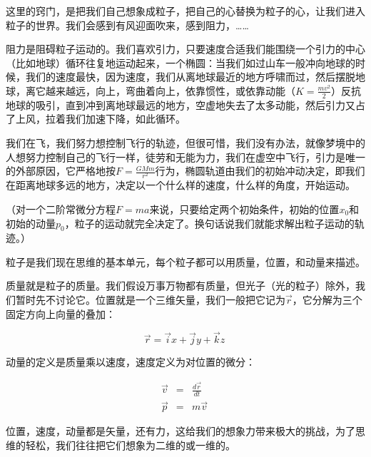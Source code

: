 这里的窍门，是把我们自己想象成粒子，把自己的心替换为粒子的心，让我们进入粒子的世界。我们会感到有风迎面吹来，感到阻力，……

阻力是阻碍粒子运动的。我们喜欢引力，只要速度合适我们能围绕一个引力的中心（比如地球）循环往复地运动起来，一个椭圆：当我们如过山车一般冲向地球的时候，我们的速度最快，因为速度，我们从离地球最近的地方呼啸而过，然后摆脱地球，离它越来越远，向上，弯曲着向上，依靠惯性，或依靠动能（$K = \frac{mv^2}{2}$）反抗地球的吸引，直到冲到离地球最远的地方，空虚地失去了太多动能，然后引力又占了上风，拉着我们加速下降，如此循环。

我们在飞，我们努力想控制飞行的轨迹，但很可惜，我们没有办法，就像梦境中的人想努力控制自己的飞行一样，徒劳和无能为力，我们在虚空中飞行，引力是唯一的外部原因，它严格地按$F = \frac{G M m}{r^2}$行为，椭圆轨道由我们的初始冲动决定，即我们在距离地球多远的地方，决定以一个什么样的速度，什么样的角度，开始运动。

（对一个二阶常微分方程$F = m a$来说，只要给定两个初始条件，初始的位置$x_0$和初始的动量$p_0$，粒子的运动就完全决定了。换句话说我们就能求解出粒子运动的轨迹。）

粒子是我们现在思维的基本单元，每个粒子都可以用质量，位置，和动量来描述。

质量就是粒子的质量。我们假设万事万物都有质量，但光子（光的粒子）除外，我们暂时先不讨论它。位置就是一个三维矢量，我们一般把它记为$\vec r$，它分解为三个固定方向上向量的叠加：

\begin{equation}
\vec r = \vec i x + \vec j y + \vec k z~
\end{equation}

动量的定义是质量乘以速度，速度定义为对位置的微分：

\begin{align}
\vec v & = & \frac{d \vec r}{d t} \\
\vec p  & = & m \vec v~
\end{align}

位置，速度，动量都是矢量，还有力，这给我们的想象力带来极大的挑战，为了思维的轻松，我们往往把它们想象为二维的或一维的。